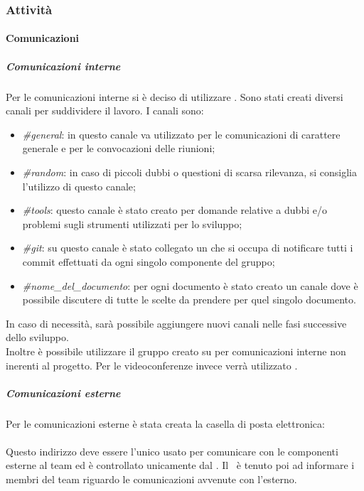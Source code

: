 \subsubsection{Attività}
	\paragraph{Comunicazioni}
		\subparagraph{Comunicazioni interne}
		Per le comunicazioni interne si è deciso di utilizzare . Sono stati creati diversi canali per suddividere il lavoro. I canali sono:
		\begin{itemize}
			\item \textit{\#general}: in questo canale va utilizzato per le comunicazioni di carattere generale e per le convocazioni delle riunioni; 
			\item \textit{\#random}: in caso di piccoli dubbi o questioni di scarsa rilevanza, si consiglia l'utilizzo di questo canale; 
			\item \textit{\#tools}: questo canale è stato creato per domande relative a dubbi e/o problemi sugli strumenti utilizzati per lo sviluppo;
			\item \textit{\#git}: su questo canale è stato collegato un  che si occupa di notificare tutti i commit effettuati da ogni singolo componente del gruppo;
			\item \textit{\#nome\_del\_documento}: per ogni documento è stato creato un canale dove è possibile discutere di tutte le scelte da prendere per quel singolo documento.
		\end{itemize}
		In caso di necessità, sarà possibile aggiungere nuovi canali nelle fasi successive dello sviluppo. \\
		Inoltre è possibile utilizzare il gruppo creato su  per comunicazioni interne non inerenti al progetto. Per le videoconferenze invece verrà utilizzato .
		\subparagraph{Comunicazioni esterne}
		Per le comunicazioni esterne è stata creata la casella di posta elettronica: \\
		\highlight{\EMAIL}\\
		Questo indirizzo deve essere l'unico usato per comunicare con le componenti esterne al team ed è controllato unicamente dal \RES. Il \RES  \ è tenuto poi ad informare i membri del team riguardo le comunicazioni avvenute con l'esterno.
